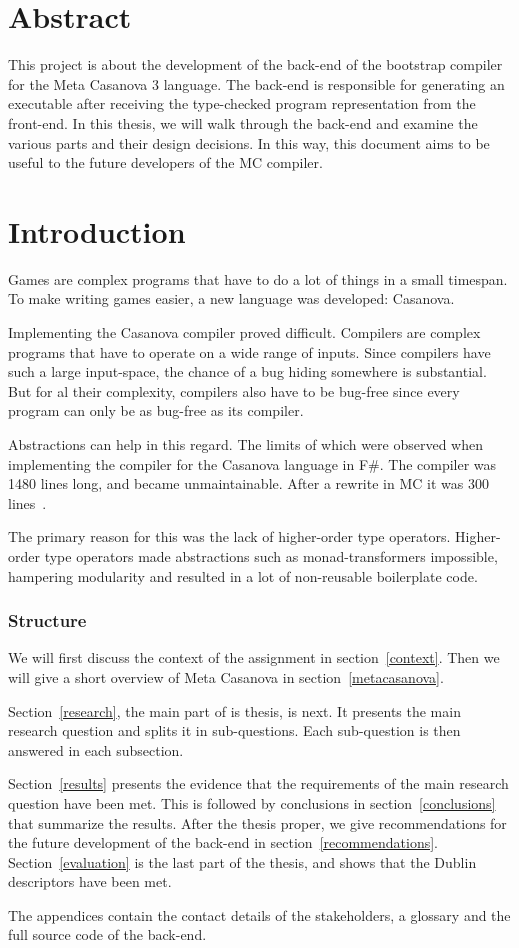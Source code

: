 \section*{Abstract}
This project is about the development of the back-end of the bootstrap compiler for the Meta Casanova 3 language.
The back-end is responsible for generating an executable after receiving the type-checked program representation from the front-end.
In this thesis, we will walk through the back-end and examine the various parts and their design decisions.
In this way, this document aims to be useful to the future developers of the MC compiler.

\section{Introduction}
Games are complex programs that have to do a lot of things in a small timespan.
To make writing games easier, a new language was developed: Casanova.

Implementing the Casanova compiler proved difficult.
Compilers are complex programs that have to operate on a wide range of inputs.
Since compilers have such a large input-space, the chance of a bug hiding somewhere is substantial. 
But for al their complexity, compilers also have to be bug-free since every program can only be as bug-free as its compiler.

Abstractions can help in this regard.
The limits of which were observed when implementing the compiler for the Casanova language in F\#.
The compiler was 1480 lines long, and became unmaintainable.
After a rewrite in MC it was 300 lines~\cite{maggiore}.

The primary reason for this was the lack of higher-order type operators.
Higher-order type operators made abstractions such as monad-transformers impossible, hampering modularity and resulted in a lot of non-reusable boilerplate code.

\subsubsection{Structure}
We will first discuss the context of the assignment in section~\ref{context}.
Then we will give a short overview of Meta Casanova in section~\ref{metacasanova}.

Section~\ref{research}, the main part of is thesis, is next.
It presents the main research question and splits it in sub-questions.
Each sub-question is then answered in each subsection.

Section~\ref{results} presents the evidence that the requirements of the main research question have been met.
This is followed by conclusions in section~\ref{conclusions} that summarize the results.
After the thesis proper, we give recommendations for the future development of the back-end in section~\ref{recommendations}.
Section~\ref{evaluation} is the last part of the thesis, and shows that the Dublin descriptors have been met.

The appendices contain the contact details of the stakeholders, a glossary and the full source code of the back-end.

